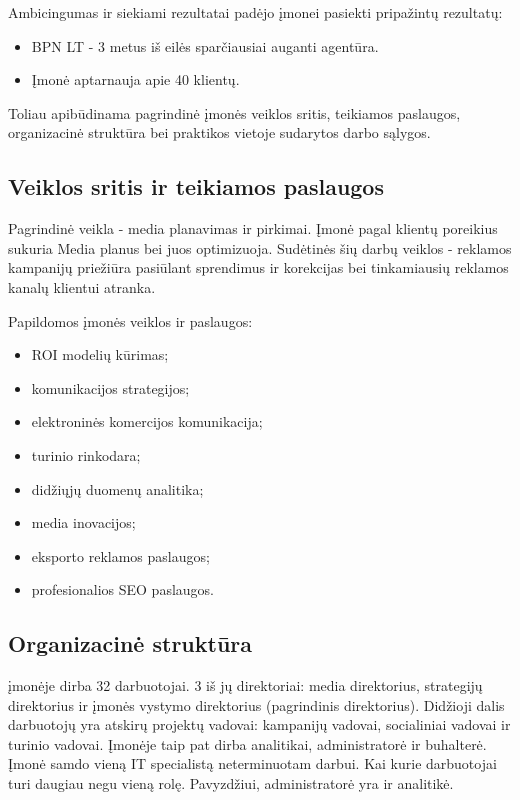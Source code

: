 \documentclass{VUMIFPSkursinis}
\begin{document}
Ambicingumas ir siekiami rezultatai padėjo įmonei pasiekti pripažintų rezultatų: 
\begin{itemize}
    \item BPN LT - 3 metus iš eilės sparčiausiai auganti agentūra.
    \item Įmonė aptarnauja apie 40 klientų.
\end{itemize}
\bigskip

Toliau apibūdinama pagrindinė įmonės veiklos sritis, teikiamos paslaugos, organizacinė struktūra bei praktikos vietoje sudarytos darbo sąlygos.

\subsection{Veiklos sritis ir teikiamos paslaugos}
Pagrindinė veikla - media planavimas ir pirkimai. Įmonė pagal klientų poreikius sukuria Media planus bei juos optimizuoja. Sudėtinės šių darbų veiklos - reklamos kampanijų priežiūra pasiūlant sprendimus ir korekcijas bei tinkamiausių reklamos kanalų klientui atranka.

Papildomos įmonės veiklos ir paslaugos:
\begin{itemize}
    \item ROI modelių kūrimas;
    \item komunikacijos strategijos;
    \item elektroninės komercijos komunikacija;
    \item turinio rinkodara;
    \item didžiųjų duomenų analitika;
    \item media inovacijos;
    \item eksporto reklamos paslaugos;
    \item profesionalios SEO paslaugos.
\end{itemize}


\subsection{Organizacinė struktūra}
įmonėje dirba 32 darbuotojai.
3 iš jų direktoriai: media direktorius, strategijų direktorius ir įmonės vystymo direktorius (pagrindinis direktorius).
Didžioji dalis darbuotojų yra atskirų projektų vadovai: kampanijų vadovai, socialiniai vadovai ir turinio vadovai. Įmonėje taip pat dirba analitikai, administratorė ir buhalterė. Įmonė samdo vieną IT specialistą neterminuotam darbui. Kai kurie darbuotojai turi daugiau negu vieną rolę. Pavyzdžiui, administratorė yra ir analitikė.
\end{document}
